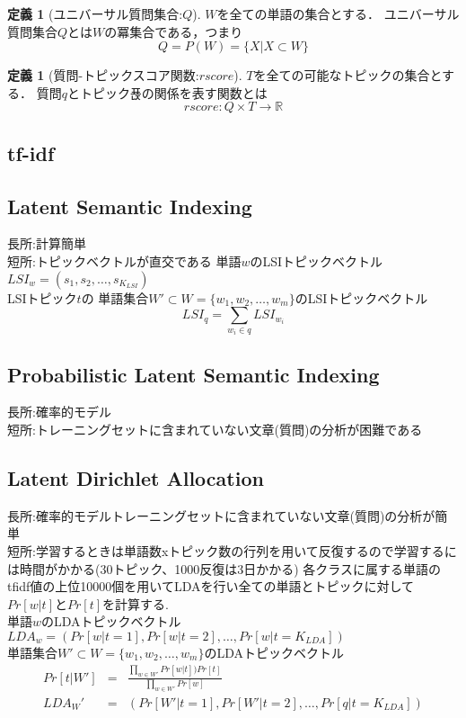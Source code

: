 \documentclass{jsarticle}
\theoremstyle{definition}
\newtheorem{defi}[thm]{定義}
\begin{document}
\begin{defi}[ユニバーサル質問集合:$Q$]
$W$を全ての単語の集合とする．
ユニバーサル質問集合$Q$とは$W$の冪集合である，つまり
\begin{equation}
Q = P(W) = \{X|X \subset W\}
\end{equation}
\end{defi}

\begin{defi}[質問-トピックスコア関数:$rscore$]
$T$を全ての可能なトピックの集合とする．
質問$q$とトピック푡の関係を表す関数とは
\begin{equation}
rscore:Q \times T \to \mathbb{R}
\end{equation}
\end{defi}


\subsection{tf-idf}
\subsection{Latent Semantic Indexing}
長所:計算簡単\\
短所:トピックベクトルが直交である
単語$w$のLSIトピックベクトル$LSI_w = (s_1,s_2, \dots , s_{K_{LSI}})$ \\
LSIトピック$t$の
単語集合$ W' \subset  W = \{w_1,w_2, \dots ,w_m\}$のLSIトピックベクトル
\begin{equation}
LSI_q = \sum_{w_i \in q}LSI_{w_i}
\end{equation}

\subsection{Probabilistic Latent Semantic Indexing}
長所:確率的モデル\\
短所:トレーニングセットに含まれていない文章(質問)の分析が困難である

\subsection{Latent Dirichlet Allocation}
長所:確率的モデルトレーニングセットに含まれていない文章(質問)の分析が簡単\\
短所:学習するときは単語数xトピック数の行列を用いて反復するので学習するには時間がかかる(30トピック、1000反復は3日かかる)
各クラスに属する単語のtfidf値の上位10000個を用いてLDAを行い全ての単語とトピックに対して$Pr[w|t]$と$Pr[t]$を計算する.\\
単語$w$のLDAトピックベクトル$LDA_w = (Pr[w|t=1],Pr[w|t=2], \dots ,Pr[w|t=K_{LDA}])$ \\
単語集合$ W' \subset W = \{w_1,w_2, \dots ,w_m\}$のLDAトピックベクトル
\begin{eqnarray}
Pr[t|W'] & = & \frac{\prod_{w \in W'}Pr[w|t])Pr[t]}{\prod_{w \in W'}Pr[w]} \\
LDA_W' & = & (Pr[W'|t=1],Pr[W'|t=2], \dots , Pr[q|t=K_{LDA}])
\end{eqnarray}
\end{document}
